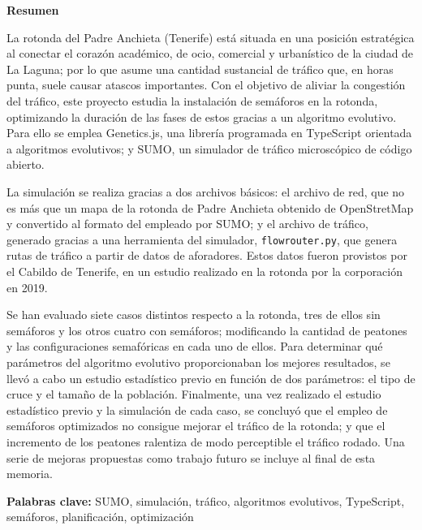 \pagestyle{empty}

\begin{center}
    \textbf{Resumen}
\end{center}

La rotonda del Padre Anchieta (Tenerife) está situada en una posición estratégica al conectar el corazón académico, de ocio, comercial y urbanístico de la ciudad de La Laguna; por lo que asume una cantidad sustancial de tráfico que, en horas punta, suele causar atascos importantes. Con el objetivo de aliviar la congestión del tráfico, este proyecto estudia la instalación de semáforos en la rotonda, optimizando la duración de las fases de estos gracias a un algoritmo evolutivo. Para ello se emplea Genetics.js, una librería programada en TypeScript orientada a algoritmos evolutivos; y SUMO, un simulador de tráfico microscópico de código abierto.

\medskip

La simulación se realiza gracias a dos archivos básicos: el archivo de red, que no es más que un mapa de la rotonda de Padre Anchieta obtenido de OpenStretMap y convertido al formato del empleado por SUMO; y el archivo de tráfico, generado gracias a una herramienta del simulador, \texttt{flowrouter.py}, que genera rutas de tráfico a partir de datos de aforadores. Estos datos fueron provistos por el Cabildo de Tenerife, en un estudio realizado en la rotonda por la corporación en 2019. 

\medskip

Se han evaluado siete casos distintos respecto a la rotonda, tres de ellos sin semáforos y los otros cuatro con semáforos; modificando la cantidad de peatones y las configuraciones semafóricas en cada uno de ellos. Para determinar qué parámetros del algoritmo evolutivo proporcionaban los mejores resultados, se llevó a cabo un estudio estadístico previo en función de dos parámetros: el tipo de cruce y el tamaño de la población. Finalmente, una vez realizado el estudio estadístico previo y la simulación de cada caso, se concluyó que el empleo de semáforos optimizados no consigue mejorar el tráfico de la rotonda; y que el incremento de los peatones ralentiza de modo perceptible el tráfico rodado. Una serie de mejoras propuestas como trabajo futuro se incluye al final de esta memoria.

\medskip

\noindent \textbf{Palabras clave:} SUMO, simulación, tráfico, algoritmos evolutivos, TypeScript, semáforos, planificación, optimización

